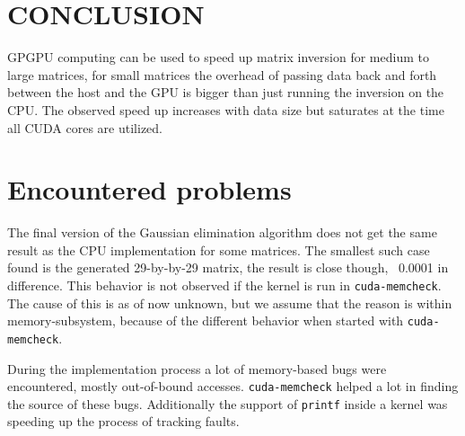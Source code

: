 
\section{CONCLUSION}
\label{sec:conclusion}

GPGPU computing can be used to speed up matrix inversion for medium to large matrices, for small matrices the overhead of passing data back and forth between the host and the GPU is bigger than just running the inversion on the CPU. The observed speed up increases with data size but saturates at the time all CUDA cores are utilized. 

\section{Encountered problems}
The final version of the Gaussian elimination algorithm does not get the same result as the CPU implementation for some matrices. The smallest such case found is the generated 29-by-by-29 matrix, the result is close though, ~0.0001 in difference. This behavior is not observed if the kernel is run in \texttt{cuda-memcheck}. The cause of this is as of now unknown, but we assume that the reason is within memory-subsystem, because of the different behavior when started with \texttt{cuda-memcheck}.

During the implementation process a lot of memory-based bugs were encountered, mostly out-of-bound accesses. \texttt{cuda-memcheck} helped a lot in finding the source of these bugs. Additionally the support of \texttt{printf} inside a kernel was speeding up the process of tracking faults.